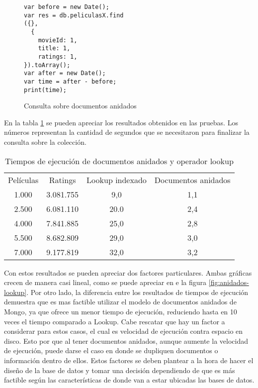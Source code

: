 \documentclass[conference,compsoc]{sty/IEEEtran}
\begin{document}
\begin{figure}
    \begin{verbatim}
var before = new Date();
var res = db.peliculasX.find
({}, 
  {
    movieId: 1,
    title: 1,
    ratings: 1,
}).toArray();
var after = new Date();
var time = after - before;
print(time);
\end{verbatim}
\caption{Consulta sobre documentos anidados} 
\label{fig:consulta-anidado}
\end{figure}

En la tabla \ref{table:2} se pueden apreciar los resultados obtenidos en las pruebas. Los números representan la cantidad de segundos que se necesitaron para finalizar la consulta sobre la colección. 

\begin{table}
\begin{center}
\begin{tabular}{ c c c c }
 Películas & Ratings & Lookup indexado & Documentos anidados \\ 
 1.000 & 3.081.755 & 9,0 & 1,1 \\  
 2.500 & 6.081.110 & 20.0 & 2,4 \\
 4.000 & 7.841.885 & 25,0 & 2,8 \\  
 5.500 & 8.682.809 & 29,0 & 3,0 \\
 7.000 & 9.177.819 & 32,0 & 3,2 \\
\end{tabular}
\end{center}
\caption{Tiempos de ejecución de documentos anidados y operador lookup}
\label{table:2}

\end{table}


Con estos resultados se pueden apreciar dos factores particulares. Ambas gráficas crecen de manera casi lineal, como se puede apreciar en e la figura \ref{fig:anidados-lookup}. Por otro lado, la diferencia entre los resultados de tiempos de ejecución demuestra que es mas factible utilizar el modelo de documentos anidados de Mongo, ya que ofrece un menor tiempo de ejecución, reduciendo hasta en 10 veces el tiempo comparado a Lookup. Cabe rescatar que hay un factor a considerar para estos casos, el cual es velocidad de ejecución contra espacio en disco. Esto por que al tener documentos anidados, aunque aumente la velocidad de ejecución, puede darse el caso en donde se dupliquen documentos o información dentro de ellos. Estos factores se deben plantear a la hora de hacer el diseño de la base de datos y tomar una decisión dependiendo de que es más factible según las características de donde van a estar ubicadas las bases de datos.  
\end{document}
